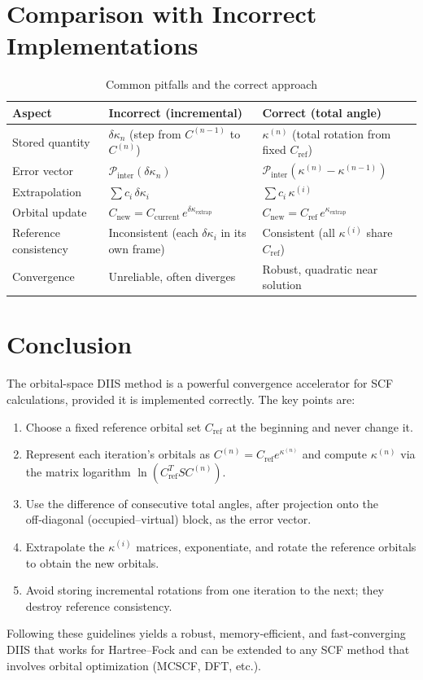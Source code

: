 \documentclass[12pt,a4paper]{article}
\begin{document}
\section{Comparison with Incorrect Implementations}

\begin{table}[htbp]
\centering
\caption{Common pitfalls and the correct approach}
\begin{tabular}{p{4cm}p{5cm}p{5cm}}
\toprule
Aspect & Incorrect (incremental) & Correct (total angle) \\
\midrule
Stored quantity & $\delta\kappa_n$ (step from $C^{(n-1)}$ to $C^{(n)}$) & $\kappa^{(n)}$ (total rotation from fixed $C_{\text{ref}}$) \\
Error vector & $\mathcal{P}_{\text{inter}}(\delta\kappa_n)$ & $\mathcal{P}_{\text{inter}}(\kappa^{(n)}-\kappa^{(n-1)})$ \\
Extrapolation & $\sum c_i\,\delta\kappa_i$ & $\sum c_i\,\kappa^{(i)}$ \\
Orbital update & $C_{\text{new}} = C_{\text{current}}\, e^{\delta\kappa_{\text{extrap}}}$ & $C_{\text{new}} = C_{\text{ref}}\, e^{\kappa_{\text{extrap}}}$ \\
Reference consistency & Inconsistent (each $\delta\kappa_i$ in its own frame) & Consistent (all $\kappa^{(i)}$ share $C_{\text{ref}}$) \\
Convergence & Unreliable, often diverges & Robust, quadratic near solution \\
\bottomrule
\end{tabular}
\end{table}

\section{Conclusion}

The orbital-space DIIS method is a powerful convergence accelerator for SCF calculations, provided it is implemented correctly. The key points are:
\begin{enumerate}
\item Choose a fixed reference orbital set $C_{\text{ref}}$ at the beginning and never change it.
\item Represent each iteration's orbitals as $C^{(n)} = C_{\text{ref}} e^{\kappa^{(n)}}$ and compute $\kappa^{(n)}$ via the matrix logarithm $\ln(C_{\text{ref}}^T S C^{(n)})$.
\item Use the difference of consecutive total angles, after projection onto the off‑diagonal (occupied–virtual) block, as the error vector.
\item Extrapolate the $\kappa^{(i)}$ matrices, exponentiate, and rotate the reference orbitals to obtain the new orbitals.
\item Avoid storing incremental rotations from one iteration to the next; they destroy reference consistency.
\end{enumerate}
Following these guidelines yields a robust, memory‑efficient, and fast‑converging DIIS that works for Hartree–Fock and can be extended to any SCF method that involves orbital optimization (MCSCF, DFT, etc.).
\end{document}
